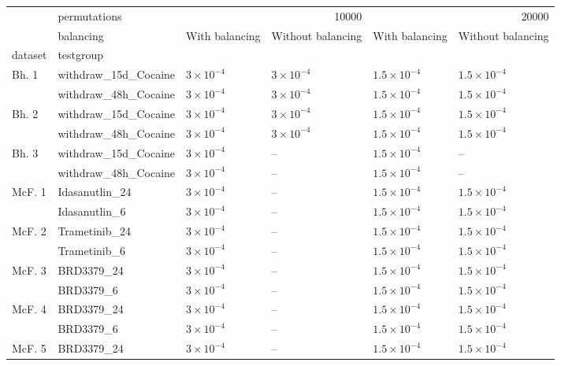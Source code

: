 \begin{tabular}{llllll}
\toprule
 & permutations & \multicolumn{2}{r}{10000} & \multicolumn{2}{r}{20000} \\
 & balancing & With balancing & Without balancing & With balancing & Without balancing \\
dataset & testgroup &  &  &  &  \\
\midrule
\multirow[t]{2}{*}{Bh. 1} & withdraw_15d_Cocaine & $3\times10^{-4}$ & $3\times10^{-4}$ & $1.5\times10^{-4}$ & $1.5\times10^{-4}$ \\
 & withdraw_48h_Cocaine & $3\times10^{-4}$ & $3\times10^{-4}$ & $1.5\times10^{-4}$ & $1.5\times10^{-4}$ \\
\cline{1-6}
\multirow[t]{2}{*}{Bh. 2} & withdraw_15d_Cocaine & $3\times10^{-4}$ & $3\times10^{-4}$ & $1.5\times10^{-4}$ & $1.5\times10^{-4}$ \\
 & withdraw_48h_Cocaine & $3\times10^{-4}$ & $3\times10^{-4}$ & $1.5\times10^{-4}$ & $1.5\times10^{-4}$ \\
\cline{1-6}
\multirow[t]{2}{*}{Bh. 3} & withdraw_15d_Cocaine & $3\times10^{-4}$ & -- & $1.5\times10^{-4}$ & -- \\
 & withdraw_48h_Cocaine & $3\times10^{-4}$ & -- & $1.5\times10^{-4}$ & -- \\
\cline{1-6}
\multirow[t]{2}{*}{McF. 1} & Idasanutlin_24 & $3\times10^{-4}$ & -- & $1.5\times10^{-4}$ & $1.5\times10^{-4}$ \\
 & Idasanutlin_6 & $3\times10^{-4}$ & -- & $1.5\times10^{-4}$ & $1.5\times10^{-4}$ \\
\cline{1-6}
\multirow[t]{2}{*}{McF. 2} & Trametinib_24 & $3\times10^{-4}$ & -- & $1.5\times10^{-4}$ & $1.5\times10^{-4}$ \\
 & Trametinib_6 & $3\times10^{-4}$ & -- & $1.5\times10^{-4}$ & $1.5\times10^{-4}$ \\
\cline{1-6}
\multirow[t]{2}{*}{McF. 3} & BRD3379_24 & $3\times10^{-4}$ & -- & $1.5\times10^{-4}$ & $1.5\times10^{-4}$ \\
 & BRD3379_6 & $3\times10^{-4}$ & -- & $1.5\times10^{-4}$ & $1.5\times10^{-4}$ \\
\cline{1-6}
\multirow[t]{2}{*}{McF. 4} & BRD3379_24 & $3\times10^{-4}$ & -- & $1.5\times10^{-4}$ & $1.5\times10^{-4}$ \\
 & BRD3379_6 & $3\times10^{-4}$ & -- & $1.5\times10^{-4}$ & $1.5\times10^{-4}$ \\
\cline{1-6}
\multirow[t]{2}{*}{McF. 5} & BRD3379_24 & $3\times10^{-4}$ & -- & $1.5\times10^{-4}$ & $1.5\times10^{-4}$ \\

\end{tabular}
